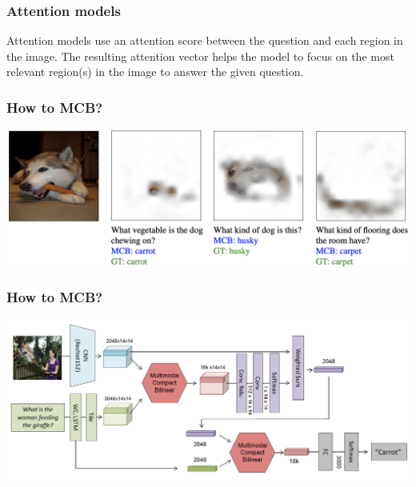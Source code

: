 \documentclass{beamer}
\begin{document}
% 
% 
\begin{frame}
\frametitle{Attention models}
Attention models use an attention score between the question and each region in the image. The resulting attention vector helps the model to focus on the most relevant region(s) in the image to answer the given question.
\end{frame}
\begin{frame}
\frametitle{How to MCB?}
\begin{center}
\includegraphics[scale=0.3]{./images/attention}
\end{center}
\end{frame}
\begin{frame}
\frametitle{How to MCB?}
\begin{center}
\includegraphics[scale=0.45]{./images/How_to_MCB03}
\end{center}
\end{frame}
\end{document}
